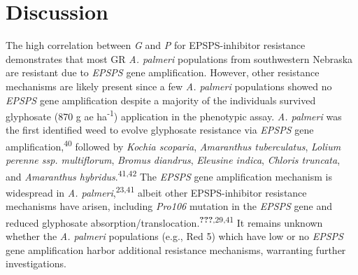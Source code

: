 \documentclass[
  12pt,
  a4paper]{article}
\begin{document}
\hypertarget{discussion}{%
\section{Discussion}\label{discussion}}

The high correlation between \emph{G} and \emph{P} for EPSPS-inhibitor
resistance demonstrates that most GR \emph{A. palmeri} populations from
southwestern Nebraska are resistant due to \emph{EPSPS} gene
amplification. However, other resistance mechanisms are likely present
since a few \emph{A. palmeri} populations showed no \emph{EPSPS} gene
amplification despite a majority of the individuals survived glyphosate
(870 g ae ha\textsuperscript{-1}) application in the phenotypic assay.
\emph{A. palmeri} was the first identified weed to evolve glyphosate
resistance via \emph{EPSPS} gene amplification,\textsuperscript{40}
followed by \emph{Kochia scoparia}, \emph{Amaranthus tuberculatus},
\emph{Lolium perenne ssp. multiflorum}, \emph{Bromus diandrus},
\emph{Eleusine indica}, \emph{Chloris truncata}, and \emph{Amaranthus
hybridus}.\textsuperscript{41,42} The \emph{EPSPS} gene amplification
mechanism is widespread in \emph{A. palmeri},\textsuperscript{23,41}
albeit other EPSPS-inhibitor resistance mechanisms have arisen,
including \emph{Pro106} mutation in the \emph{EPSPS} gene and reduced
glyphosate
absorption/translocation.\textsuperscript{{\textbf{???}},29,41} It
remains unknown whether the \emph{A. palmeri} populations (e.g., Red 5)
which have low or no \emph{EPSPS} gene amplification harbor additional
resistance mechanisms, warranting further investigations.
\end{document}
